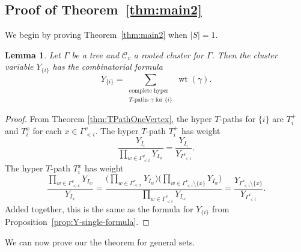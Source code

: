 \documentclass[pdftex]{sigma}
\numberwithin{equation}{section}
\newtheorem{Lemma}[Theorem]{Lemma}
\DeclareMathOperator{\wt}{wt}
\newcommand{\calC}{\mathcal{C}}
\begin{document}
\subsection[Proof of the hyper T-path expansion theorem]{Proof of Theorem~\ref{thm:main2}}\label{sec:pf-thm-2}
We begin by proving Theorem~\ref{thm:main2} when $|S|=1$.
\begin{Lemma}
Let $\Gamma$ be a tree and $\calC_v$ a rooted cluster for $\Gamma$. Then the cluster variable $Y_{\{i\}}$ has the combinatorial formula \[ Y_{\{i\}}=\sum_{\substack{\text{complete hyper}\\T\text{-paths }\gamma\text{ for }\{i\}}}\wt(\gamma).\]
\end{Lemma}
\begin{proof}
From Theorem \ref{thm:TPathOneVertex}, the hyper $T$-paths for $\{i\}$ are $T_i^{+}$ and $T_i^x$ for each $x\in\Gamma_{\lessdot i}^v$. The hyper $T$-path $T_i^{+}$ has weight \[ \frac{Y_{I_{i}}}{\prod_{w\in\Gamma_{\lessdot i}^v} Y_{I_{w}}}=\frac{Y_{I_{i}}}{Y_{\Gamma_{< i}^v}}.\]
The hyper $T$-path $T_i^x$ has weight
\[ \frac{\prod_{w \in \Gamma_{\lessdot x}^v} Y_{I_w}}{Y_{I_{x}}} = \frac{\Big(\prod_{w \in \Gamma_{\lessdot x}^v} Y_{I_w}\Big)\Big(\prod_{w\in\Gamma_{\lessdot i}^v\setminus\{x\}} Y_{I_{w}}\Big)}{\prod_{w\in\Gamma_{\lessdot i}^v} Y_{I_{w}}}= \frac{Y_{\Gamma_{< i}^v\setminus\{x\}} }{Y_{\Gamma_{< i}^v}}.\]
Added together, this is the same as the formula for $Y_{\{i\}}$ from Proposition~\ref{prop:Y-single-formula}.
\end{proof}
We can now prove our the theorem for general sets.
\end{document}
